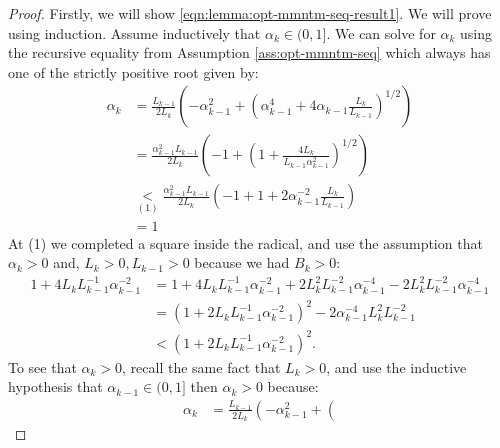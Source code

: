 \documentclass[12pt]{article}
\begin{document}
        \begin{proof}
            Firstly, we will show \eqref{eqn:lemma:opt-mmntm-seq-result1}. 
            We will prove using induction.
            Assume inductively that $\alpha_k \in (0, 1]$. 
            We can solve for $\alpha_k$ using the recursive equality from Assumption \ref{ass:opt-mmntm-seq} which always has one of the strictly positive root given by: 
            \begin{align*}
                \alpha_k &=
                \frac{L_{k - 1}}{2L_k}\left(
                    - \alpha_{k - 1}^2 + \left(
                        \alpha_{k - 1}^4 + 4 \alpha_{k - 1}\frac{L_k}{L_{k - 1}}
                    \right)^{1/2}
                \right)
                \\
                &= \frac{\alpha_{k - 1}^2L_{k - 1}}{2L_k}\left(
                    - 1 + \left(
                        1 + \frac{4 L_k}{L_{k - 1}\alpha_{k-1}^2}
                    \right)^{1/2}
                \right)
                \\
                &\underset{(1)}{<} \frac{\alpha_{k - 1}^2L_{k - 1}}{2L_k}\left(
                    - 1 + 1 + 2 \alpha_{k - 1}^{-2}\frac{L_k}{L_{k - 1}}
                \right)
                \\
                &= 1
            \end{align*}
            At (1) we completed a square inside the radical, and use the assumption that $\alpha_k > 0$ and, $L_k > 0, L_{k - 1} > 0$ because we had $B_k > 0$: 
            \begin{align*}
                1 + 4 L_{k}L_{k - 1}^{-1}\alpha_{k - 1}^{-2}
                &= 
                1 + 4 L_{k}L_{k - 1}^{-1}\alpha_{k - 1}^{-2}
                + 2L_k^2L_{k - 1}^{-2}\alpha_{k - 1}^{-4}
                - 2L_k^2L_{k - 1}^{-2}\alpha_{k - 1}^{-4}
                \\
                &= (1 + 2L_kL_{k - 1}^{-1}\alpha_{k - 1}^{-2})^2
                - 2\alpha_{k - 1}^{-4}L_k^2L_{k - 1}^{-2}
                \\
                &< \left(1 + 2L_kL_{k - 1}^{-1}\alpha_{k - 1}^{-2}\right)^2. 
            \end{align*}
            To see that $\alpha_k > 0$, recall the same fact that $L_k > 0$, and use the inductive hypothesis that $\alpha_{k - 1} \in (0, 1]$ then $\alpha_k > 0$ because: 
            \begin{align*}
                \alpha_k &=
                \frac{L_{k - 1}}{2L_k}\left(
                    - \alpha_{k - 1}^2 + \left(

\end{align*}
\end{proof}
\end{document}
